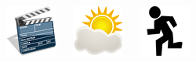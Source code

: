 \documentclass[green]{beamer}
\begin{document}
\begin{frame}
\begin{columns}[c]
	\begin{center}
	    \includegraphics[scale=0.28]{img/claqueta.png}
	\end{center}
	
	\begin{center}
	    \includegraphics[scale=0.3]{img/entorno.png}
	\end{center}
	\begin{center}
	    \includegraphics[scale=0.3]{img/animacion.png}
	\end{center}
	
    \end{columns} 
\end{frame}
\end{document}
